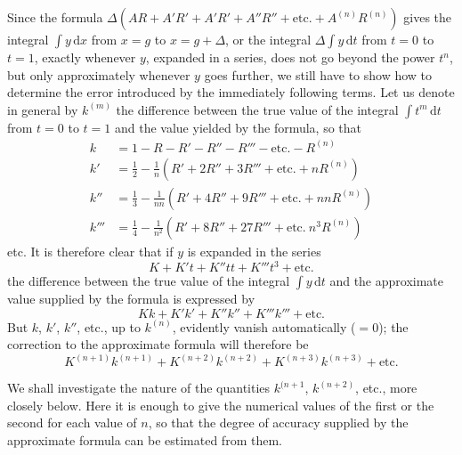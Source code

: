 
Since the formula $\Delta(AR+\allowbreak A'R'+\allowbreak A'R'+\allowbreak A''R''+\allowbreak \text{etc.}+\allowbreak A^{(n)}R^{(n)})$ gives the integral $\int y\,\mathrm{d}x$ from $x=g$ to $x=g+\Delta$, or the integral $\Delta\int y\,\mathrm{d}t$ from $t=0$ to $t=1$, exactly whenever $y$, expanded in a series, does not go beyond the power $t^n$, but only approximately whenever $y$ goes further, we still have to show how to determine the error introduced by the immediately following terms. Let us denote in general by $k^{(m)}$ the difference between the true value of the integral $\int t^m\,\mathrm{d}t$ from $t=0$ to $t=1$ and the value yielded by the formula, so that
\[
\begin{aligned}
k&=1-R-R'-R''-R'''-\text{etc.}-R^{(n)}\\
k'&=\frac12-\frac1n(R'+2R''+3R'''+\text{etc.}+nR^{(n)})\\
k''&=\frac13-\frac1{nn}(R'+4R''+9R'''+\text{etc.}+nnR^{(n)})\\
k'''&=\frac14-\frac1{n^2}(R'+8R''+27R'''+\text{etc.}\ n^3R^{(n)})
\end{aligned}
\]
etc. It is therefore clear that if $y$ is expanded in the series
\[
K+K't+K''tt+K'''t^3+\text{etc.}
\]
the difference between the true value of the integral $\int y\,\mathrm{d}t$ and the approximate value supplied by the formula is expressed by
\[
Kk+K'k'+K''k''+K'''k'''+\text{etc.}
\]
But $k$, $k'$, $k''$, etc., up to $k^{(n)}$, evidently vanish automatically ($=0$); the correction to the approximate formula will therefore be
\[
K^{(n+1)}k^{(n+1)}+K^{(n+2)}k^{(n+2)}+K^{(n+3)}k^{(n+3)}+\text{etc.}
\]

We shall investigate the nature of the quantities $k^{(n+1}$, $k^{(n+2)}$, etc., more closely below. Here it is enough to give the numerical values of the first or the second for each value of $n$, so that the degree of accuracy supplied by the approximate formula can be estimated from them.

